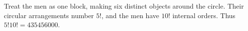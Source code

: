 Treat the men as one block, making six distinct objects around the circle. Their circular arrangements number $ 5!$, and the men have $ 10!$ internal orders. Thus $\boxed{5!10!=435456000}$.
